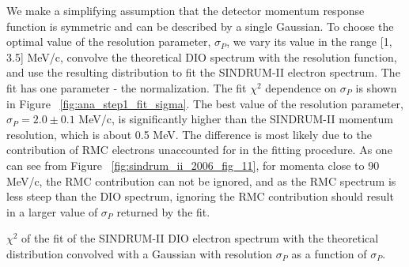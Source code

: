 We make a simplifying assumption that the detector momentum response function is symmetric and
can be described by a single Gaussian. To choose the optimal value of the resolution parameter,
$\sigma_P$, we vary its value in the range [1, 3.5] MeV/c, convolve the theoretical DIO spectrum
with the resolution function, and use the resulting distribution to fit the SINDRUM-II
electron spectrum. The fit has one parameter - the normalization. The fit $\chi^2$ dependence
on $\sigma_P$ is shown in Figure ~\ref{fig:ana_step1_fit_sigma}.
%
The best value of the resolution parameter, $\sigma_P = 2.0 \pm 0.1$ MeV/c, is significantly
higher than the SINDRUM-II momentum resolution, which is about 0.5 MeV.
The difference is most likely due to the contribution of RMC electrons unaccounted for
in the fitting procedure. As one can see from Figure ~\ref{fig:sindrum_ii_2006_fig_11},
for momenta close to 90 MeV/c, the RMC contribution can not be ignored, and as the RMC spectrum
is less steep than the DIO spectrum, ignoring the RMC contribution should result in a
larger value of $\sigma_P$ returned by the fit. 

\vspace{0.2in}
%
 {
  \label{fig:ana_step1_fit_sigma}
  $\chi^2$ of the fit of the SINDRUM-II DIO electron spectrum with the theoretical distribution
  convolved with a Gaussian with resolution $\sigma_P$ as a function of $\sigma_P$.
}
\vspace{0.2in}

